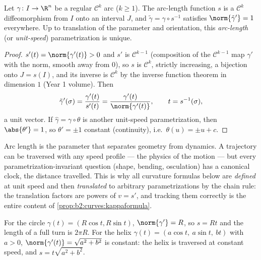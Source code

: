 \begin{theorem}\label{thm:b2:curves:arclength}
Let $\gamma \colon I \to \R^n$ be a regular $\mathcal{C}^k$ arc
($k \geq 1$). The arc-length function $s$ is a $\mathcal{C}^k$
diffeomorphism from $I$ onto an interval $J$, and $\tilde\gamma =
\gamma \circ s^{-1}$ satisfies $\norm{\tilde\gamma'} = 1$
everywhere. Up to translation of the parameter and orientation,
this \emph{arc-length} (or \emph{unit-speed}) parametrization is
unique.
\end{theorem}

\begin{proof}
$s'(t) = \norm{\gamma'(t)} > 0$ and $s'$ is $\mathcal{C}^{k-1}$
(composition of the $\mathcal{C}^{k-1}$ map $\gamma'$ with the norm,
smooth away from $0$), so $s$ is $\mathcal{C}^k$, strictly
increasing, a bijection onto $J = s(I)$, and its inverse is
$\mathcal{C}^k$ by the inverse function theorem in dimension $1$
(Year 1 volume). Then
\[
\tilde\gamma'(\sigma)
= \frac{\gamma'(t)}{s'(t)}
= \frac{\gamma'(t)}{\norm{\gamma'(t)}},
\qquad t = s^{-1}(\sigma),
\]
a unit vector. If $\hat\gamma = \gamma\circ\theta$ is another
unit-speed parametrization, then $\abs{\theta'} = 1$, so $\theta'
= \pm 1$ constant (continuity), i.e.\ $\theta(u) = \pm u + c$.
\end{proof}

\begin{remark}
Arc length is the parameter that separates geometry from
dynamics. A trajectory can be traversed with any speed
profile --- the physics of the motion --- but every
parametrization-invariant question (shape, bending,
osculation) has a canonical clock, the distance travelled.
This is why all curvature formulas below are \emph{defined}
at unit speed and then \emph{translated} to arbitrary
parametrizations by the chain rule: the translation factors
are powers of $v = s'$, and tracking them correctly is the
entire content of \cref{prop:b2:curves:kappaformula}.
\end{remark}

\begin{example}\label{ex:b2:curves:helix}
For the circle $\gamma(t) = (R\cos t, R\sin t)$, $\norm{\gamma'} =
R$, so $s = Rt$ and the length of a full turn is $2\pi R$. For the
helix $\gamma(t) = (a\cos t,\ a\sin t,\ bt)$ with $a > 0$,
$\norm{\gamma'(t)} = \sqrt{a^2 + b^2}$ is constant: the helix is
traversed at constant speed, and $s = t\sqrt{a^2 + b^2}$.
\end{example}

